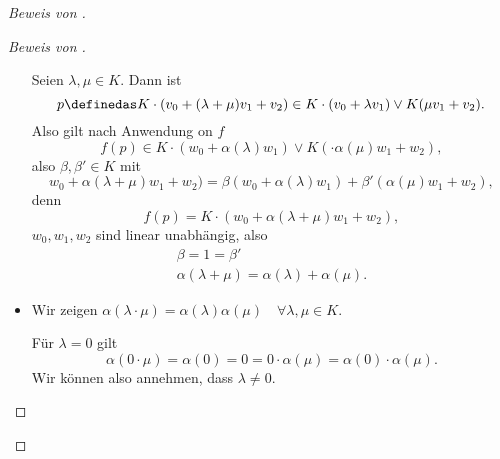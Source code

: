 \begin{proof}[Beweis von ]
\begin{proof}[Beweis von ]
\begin{itemize}
      Seien \( \lambda,\mu\in K \). Dann ist
      \begin{equation*}
        p\definedas K\cdot(v_0+(\lambda+\mu)v_1+v_2)\in K\cdot (v_0+\lambda v_1)\vee K(\mu v_1+v_2).
      \end{equation*}
      Also gilt nach Anwendung on \( f \)
      \begin{equation*}
        f(p)\in K\cdot(w_0+\alpha(\lambda)w_1)\vee K(\cdot\alpha(\mu)w_1+w_2),
      \end{equation*}
      also \texists \( \beta,\beta'\in K \) mit
      \begin{equation*}
        w_0+\alpha(\lambda+\mu)w_1+w_2)=\beta(w_0+\alpha(\lambda)w_1)+\beta'(\alpha(\mu)w_1+w_2),
      \end{equation*}
      denn
      \begin{equation*}
        f(p)=K\cdot(w_0+\alpha(\lambda+\mu)w_1+w_2),
      \end{equation*}
      \( w_0,w_1,w_2 \) sind linear unabhängig, also
      \begin{gather*}
        \beta=1=\beta'\\
        \alpha(\lambda+\mu)=\alpha(\lambda)+\alpha(\mu).
      \end{gather*}
      \item Wir zeigen \( \alpha(\lambda\cdot \mu)=\alpha(\lambda)\alpha(\mu) \quad \forall \lambda,\mu\in K\).
      
      Für \( \lambda=0 \) gilt
      \begin{equation*}
        \alpha(0\cdot \mu)=\alpha(0)=0=0\cdot \alpha(\mu)=\alpha(0)\cdot \alpha(\mu).
      \end{equation*}
      Wir können also annehmen, dass \( \lambda\neq 0 \).


\end{itemize}
\end{proof}
\end{proof}
